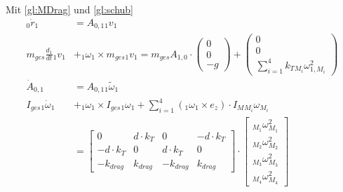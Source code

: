 Mit \ref{gl:MDrag} und \ref{gl:schub}
\begin{align}
    {_{0}\dot{r}_{1}} &= A_{0, 1} {_{1}v_{1}} \\
    m_{ges} \frac{d_1}{dt} {_{1}v_{1}} &+ {_{1}\omega_{1}} \times m_{ges} {_{1}v_{1}} = m_{ges} A_{1, 0} \cdot \begin{pmatrix} 0 \\ 0 \\ -g \end{pmatrix} + {\begin{pmatrix} 0 \\ 0 \\ \sum_{i = 1}^4 k_{T} {_{M_i}\omega^2_{1, M_i}} \end{pmatrix}} \\
    {{\dot{A}_{0, 1}}} &= {A_{0, 1}} \tilde{_{1} {\omega}_{1}}\\
    I_{ges} {_{1} \dot{\omega}_{1}} &+ {_{1} {\omega}_{1}} \times I_{ges} {_{1} {\omega}_{1}} + \sum_{i=1}^{4}{({_{1}{\omega}_{1}} \times e_z) \cdot I_{M} {_{M_i}\omega_{M_i}} } \\
    &= \begin{bmatrix} 0              & d \cdot k_{T} & 0             & -d \cdot k_{T} \\ 
                       -d \cdot k_{T} & 0             & d \cdot k_{T} & 0  \\
                       -k_{drag}      & k_{drag}      & -k_{drag}    & k_{drag}
       \end{bmatrix}
    \cdot 
    \begin{bmatrix}
      {_{M_1} {\omega}^2_{M_1}} \\
      {_{M_2} {\omega}^2_{M_2}}\\
      {_{M_3} {\omega}^2_{M_3}}\\
      {_{M_4} {\omega}^2_{M_4}}
    \end{bmatrix}
\end{align}

